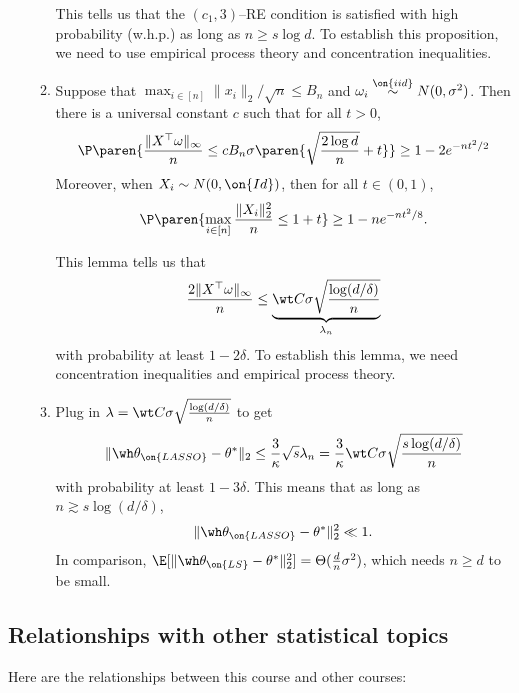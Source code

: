 \begin{ex}
\begin{enumerate}[label = (\alph*)]
\begin{enumerate}[label = \arabic*.]
This tells us that the $(c_1,3)$--RE condition is satisfied with high probability (w.h.p.) as long as $n \geq s \log d$. To establish this proposition, we need to use empirical process theory and concentration inequalities.

\item 

\begin{lem}
Suppose that $\max_{i \in [n]} \| x_i\|_2/\sqrt n \leq B_n$ and $\omega_i \overset{\on{iid}}{\sim} N(0,\sigma^2)$. Then there is a universal constant $c$ such that for all $t > 0$,
$$\P\paren{\frac{\| X^\top \omega \|_\infty}{n} \leq c B_n \sigma \paren{\sqrt{\frac{2 \log d}{n}} + t}} \geq 1 - 2 e^{-nt^2/2}$$
Moreover, when $X_i \sim N(0,\on{Id})$, then for all $t \in (0,1)$,
$$\P \paren{\max_{i \in [n]} \frac{\| X_i \|_2^2}{n} \leq 1 + t} \geq 1 - n e^{- n t^2/8}.$$
\end{lem}
This lemma tells us that
$$\frac{2 \| X^\top \omega \|_\infty}{n} \leq \underbrace{\wt C \sigma \sqrt{\frac{\log (d/\delta)}{n}}}_{\lambda_n}$$
with probability at least $1-2\delta$. To establish this lemma, we need concentration inequalities and empirical process theory.

\item Plug in $\lambda = \wt C \sigma  \sqrt{\frac{\log (d/\delta)}{n}}$ to get
$$\| \wh \theta_{\on{LASSO}} - \theta^* \|_2 \leq \frac{3}{\kappa} \sqrt s \lambda_n = \frac{3}{\kappa} \wt C \sigma \sqrt{\frac{s \log (d/\delta)}{n}}$$
with probability at least $1 - 3\delta$. This means that as long as $n \gtrsim s \log(d/\delta)$,
$$\| \wh \theta_{\on{LASSO}} - \theta^*\|_2^2 \ll 1.$$
In comparison, $\E[ \| \wh \theta_{\on{LS}} - \theta^* \|_2^2] = \Theta(\frac{d}{n} \sigma^2)$, which needs $n \geq d$ to be small.

\end{enumerate}
\end{enumerate}
\end{ex}

\subsection{Relationships with other statistical topics}

Here are the relationships between this course and other courses:

